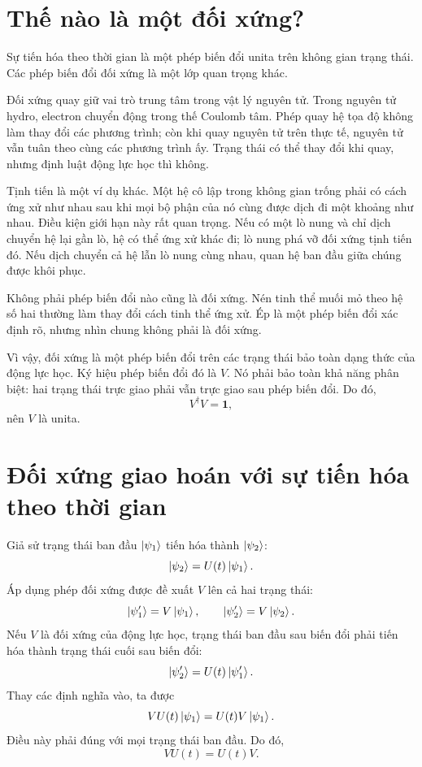 \section{Thế nào là một đối xứng?}

Sự tiến hóa theo thời gian là một phép biến đổi unita trên không gian trạng thái. Các phép biến đổi đối xứng là một lớp quan trọng khác.

Đối xứng quay giữ vai trò trung tâm trong vật lý nguyên tử. Trong nguyên tử hydro, electron chuyển động trong thế Coulomb tâm. Phép quay hệ tọa độ không làm thay đổi các phương trình; còn khi quay nguyên tử trên thực tế, nguyên tử vẫn tuân theo cùng các phương trình ấy. Trạng thái có thể thay đổi khi quay, nhưng định luật động lực học thì không.

Tịnh tiến là một ví dụ khác. Một hệ cô lập trong không gian trống phải có cách ứng xử như nhau sau khi mọi bộ phận của nó cùng được dịch đi một khoảng như nhau. Điều kiện giới hạn này rất quan trọng. Nếu có một lò nung và chỉ dịch chuyển hệ lại gần lò, hệ có thể ứng xử khác đi; lò nung phá vỡ đối xứng tịnh tiến đó. Nếu dịch chuyển cả hệ lẫn lò nung cùng nhau, quan hệ ban đầu giữa chúng được khôi phục.

Không phải phép biến đổi nào cũng là đối xứng. Nén tinh thể muối mỏ theo hệ số hai thường làm thay đổi cách tinh thể ứng xử. Ép là một phép biến đổi xác định rõ, nhưng nhìn chung không phải là đối xứng.

Vì vậy, đối xứng là một phép biến đổi trên các trạng thái bảo toàn dạng thức của động lực học. Ký hiệu phép biến đổi đó là \(V\). Nó phải bảo toàn khả năng phân biệt: hai trạng thái trực giao phải vẫn trực giao sau phép biến đổi. Do đó,
\begin{equation}
V^\dagger V=\mathbf 1,
\end{equation}
nên \(V\) là unita.

\section{Đối xứng giao hoán với sự tiến hóa theo thời gian}

Giả sử trạng thái ban đầu \(\left\lvert\psi_1\right\rangle\) tiến hóa thành \(\left\lvert\psi_2\right\rangle\):
\begin{equation}
\left\lvert\psi_2\right\rangle=U(t)\left\lvert\psi_1\right\rangle.
\end{equation}
Áp dụng phép đối xứng được đề xuất \(V\) lên cả hai trạng thái:
\begin{equation}
\left\lvert\psi_1'\right\rangle=V\left\lvert\psi_1\right\rangle,
\qquad
\left\lvert\psi_2'\right\rangle=V\left\lvert\psi_2\right\rangle.
\end{equation}
Nếu \(V\) là đối xứng của động lực học, trạng thái ban đầu sau biến đổi phải tiến hóa thành trạng thái cuối sau biến đổi:
\begin{equation}
\left\lvert\psi_2'\right\rangle=U(t)\left\lvert\psi_1'\right\rangle.
\end{equation}
Thay các định nghĩa vào, ta được
\begin{equation}
VU(t)\left\lvert\psi_1\right\rangle
=
U(t)V\left\lvert\psi_1\right\rangle.
\end{equation}
Điều này phải đúng với mọi trạng thái ban đầu. Do đó,
\begin{equation}
VU(t)=U(t)V.
\end{equation}

